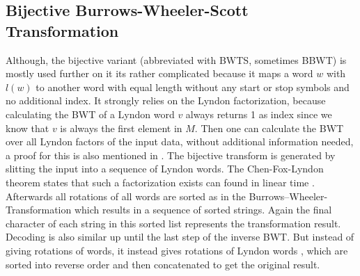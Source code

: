 \subsection{Bijective Burrows-Wheeler-Scott Transformation}
\label{ch:Principles of compression:sec:Other:subSec:bwtscott}
\par{
Although, the bijective variant (abbreviated with BWTS, sometimes BBWT) is mostly used further on it its rather complicated because it maps a word $w$ with $l(w)$ to another word with equal length without any start or stop symbols and no additional index. It strongly relies on the Lyndon factorization, because calculating the BWT of a Lyndon word $v$ always returns 1 as index since we know that $v$ is always the first element in $M$. Then one can calculate the BWT over all Lyndon factors of the input data, without additional information needed, a proof for this is also mentioned in \cite{kufleitner2009bijective}. The bijective transform is generated by slitting the input into a sequence of Lyndon words. The Chen-Fox-Lyndon \cite{chenFoxlyndonTheorem} theorem states that such a factorization exists can found in linear time \cite{lyndonFactorLinearTime}. Afterwards all rotations of all words are sorted as in the Burrows–Wheeler-Transformation which results in a sequence of sorted strings. Again the final character of each string in this sorted list represents the transformation result. Decoding is also similar up until the last step of the inverse BWT. But instead of giving rotations of words, it instead gives rotations of Lyndon words , which are sorted into reverse order and then concatenated to get the original result.
}

